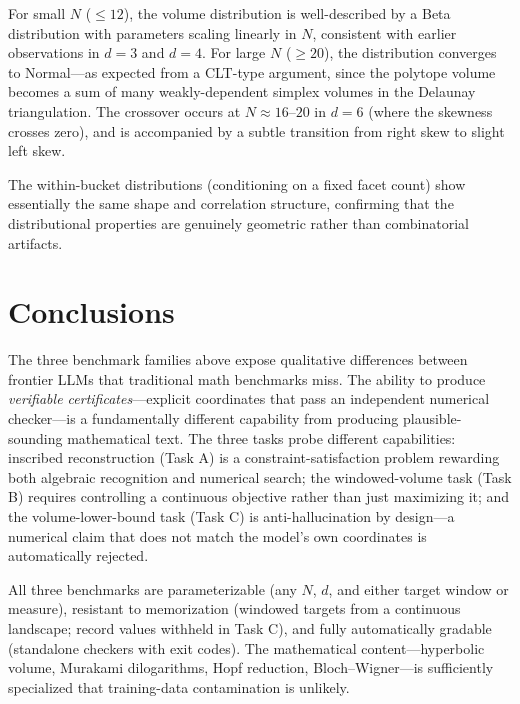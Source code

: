 \documentclass[11pt]{article}
\begin{document}
For small $N$ ($\leq 12$), the volume distribution is well-described by
a Beta distribution with parameters scaling linearly in $N$, consistent
with earlier observations in $d = 3$ and $d = 4$.
For large $N$ ($\geq 20$), the distribution converges to Normal---as
expected from a CLT-type argument, since the polytope volume becomes a
sum of many weakly-dependent simplex volumes in the Delaunay triangulation.
The crossover occurs at $N \approx 16\text{--}20$ in $d = 6$ (where the
skewness crosses zero), and is accompanied by a subtle transition from
right skew to slight left skew.

The within-bucket distributions (conditioning on a fixed facet count) show
essentially the same shape and correlation structure, confirming that the
distributional properties are genuinely geometric rather than combinatorial
artifacts.

\section{Conclusions}

The three benchmark families above expose qualitative differences
between frontier LLMs that traditional math benchmarks miss. The
ability to produce \emph{verifiable certificates}---explicit
coordinates that pass an independent numerical checker---is a
fundamentally different capability from producing plausible-sounding
mathematical text.  The three tasks probe different capabilities:
inscribed reconstruction (Task A) is a constraint-satisfaction
problem rewarding both algebraic recognition and numerical search;
the windowed-volume task (Task B) requires controlling a continuous
objective rather than just maximizing it; and the volume-lower-bound
task (Task C) is anti-hallucination by design---a numerical claim
that does not match the model's own coordinates is automatically
rejected.

All three benchmarks are parameterizable (any $N$, $d$, and either
target window or measure), resistant to memorization (windowed
targets from a continuous landscape; record values withheld in
Task C), and fully automatically gradable (standalone checkers with
exit codes).  The mathematical content---hyperbolic volume,
Murakami dilogarithms, Hopf reduction, Bloch--Wigner---is
sufficiently specialized that training-data contamination is
unlikely.
\end{document}
